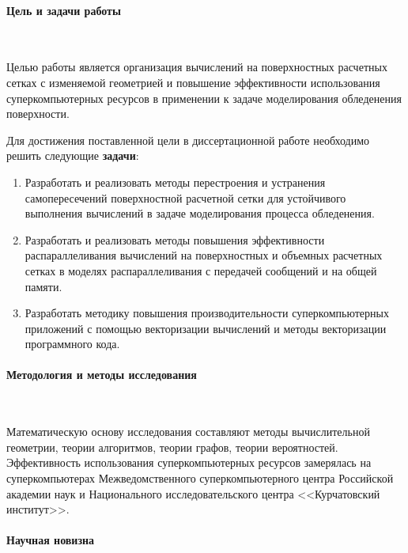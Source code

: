 \documentclass[a4paper,14pt]{extarticle}                     %
\theoremstyle{plain}                                         %
\begin{document}
\paragraph{Цель и задачи работы}

\

Целью работы является организация вычислений на поверхностных расчетных сетках с изменяемой геометрией и повышение эффективности использования суперкомпьютерных ресурсов в применении к задаче моделирования обледенения поверхности.

Для достижения поставленной цели в диссертационной работе необходимо решить следующие \textbf{задачи}:
\begin{enumerate}[noitemsep,topsep=0pt,parsep=0pt,partopsep=0pt]
\item Разработать и реализовать методы перестроения и устранения самопересечений поверхностной расчетной сетки для устойчивого выполнения вычислений в задаче моделирования процесса обледенения.
\item Разработать и реализовать методы повышения эффективности распараллеливания вычислений на поверхностных и объемных расчетных сетках в моделях распараллеливания с передачей сообщений и на общей памяти.
\item Разработать методику повышения производительности суперкомпьютерных приложений с помощью векторизации вычислений и методы векторизации программного кода.
\end{enumerate}

\paragraph{Методология и методы исследования}

\

Математическую основу исследования составляют методы вычислительной геометрии, теории алгоритмов, теории графов, теории вероятностей.
Эффективность использования суперкомпьютерных ресурсов замерялась на суперкомпьютерах Межведомственного суперкомпьютерного центра Российской академии наук и Национального исследовательского центра <<Курчатовский институт>>.

\paragraph{Научная новизна}

\
\end{document}
